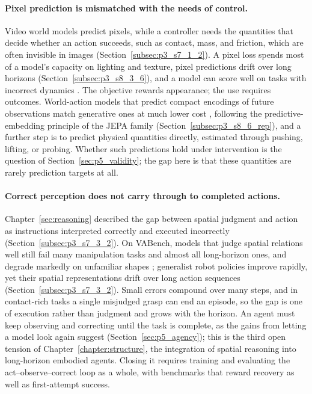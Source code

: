 \paragraph{Pixel prediction is mismatched with the needs of control.}
Video world models predict pixels, while a controller needs the quantities that decide whether an action succeeds, such as contact, mass, and friction, which are often invisible in images (Section~\ref{subsec:p3_s7_1_2}).
A pixel loss spends most of a model's capacity on lighting and texture, pixel predictions drift over long horizons (Section~\ref{subsec:p3_s8_3_6}), and a model can score well on tasks with incorrect dynamics \cite{gonzalezlaiz2026limits}.
The objective rewards appearance; the use requires outcomes.
World-action models that predict compact encodings of future observations match generative ones at much lower cost \cite{yu2026jam}, following the predictive-embedding principle of the JEPA family (Section~\ref{subsec:p3_s8_6_rep}), and a further step is to predict physical quantities directly, estimated through pushing, lifting, or probing.
Whether such predictions hold under intervention is the question of Section~\ref{sec:p5_validity}; the gap here is that these quantities are rarely prediction targets at all.

\paragraph{Correct perception does not carry through to completed actions.}
Chapter~\ref{sec:reasoning} described the gap between spatial judgment and action as instructions interpreted correctly and executed incorrectly (Section~\ref{subsec:p3_s7_3_2}).
On VABench, models that judge spatial relations well still fail many manipulation tasks and almost all long-horizon ones, and degrade markedly on unfamiliar shapes \cite{zhang2026vabench}; generalist robot policies improve rapidly, yet their spatial representations drift over long action sequences (Section~\ref{subsec:p3_s7_3_2}).
Small errors compound over many steps, and in contact-rich tasks a single misjudged grasp can end an episode, so the gap is one of execution rather than judgment and grows with the horizon.
An agent must keep observing and correcting until the task is complete, as the gains from letting a model look again suggest (Section~\ref{sec:p5_agency}); this is the third open tension of Chapter~\ref{chapter:structure}, the integration of spatial reasoning into long-horizon embodied agents.
Closing it requires training and evaluating the act--observe--correct loop as a whole, with benchmarks that reward recovery as well as first-attempt success.

